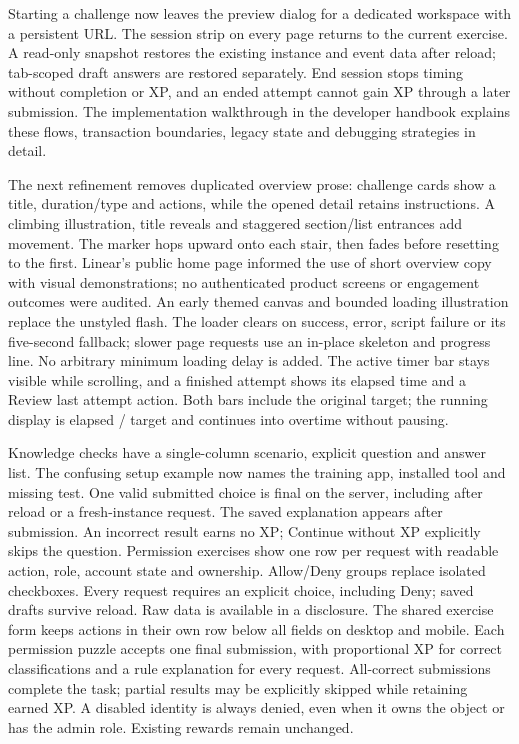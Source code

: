 Starting a challenge now leaves the preview dialog for a dedicated workspace with
a persistent URL. The session strip on every page returns to the current exercise.
A read-only snapshot restores the existing instance and event data after reload;
tab-scoped draft answers are restored separately. End session stops timing without
completion or XP, and an ended attempt cannot gain XP through a later submission.
The implementation walkthrough in the developer handbook explains these flows,
transaction boundaries, legacy state and debugging strategies in detail.

The next refinement removes duplicated overview prose: challenge cards show a title,
duration/type and actions, while the opened detail retains instructions. A climbing
illustration, title reveals and staggered section/list entrances add movement.
The marker hops upward onto each stair, then fades before resetting to the first.
Linear's public home page informed the use of short overview copy with visual
demonstrations; no authenticated product screens or engagement outcomes were audited.
An early themed canvas and bounded loading illustration replace the unstyled flash.
The loader clears on success, error, script failure or its five-second fallback;
slower page requests use an in-place skeleton and progress line. No arbitrary minimum
loading delay is added. The active timer bar stays visible while scrolling, and a
finished attempt shows its elapsed time and a Review last attempt action. Both bars
include the original target; the running display is elapsed / target and continues
into overtime without pausing.

Knowledge checks have a single-column scenario, explicit question and answer list.
The confusing setup example now names the training app, installed tool and missing
test. One valid submitted choice is final on the server, including after reload or
a fresh-instance request. The saved explanation appears after submission. An
incorrect result earns no XP; Continue without XP explicitly skips the question.
Permission exercises show one row per request with readable action, role, account
state and ownership. Allow/Deny groups replace isolated checkboxes. Every request
requires an explicit choice, including Deny; saved drafts survive reload. Raw data
is available in a disclosure. The shared exercise form keeps actions in their own
row below all fields on desktop and mobile.
Each permission puzzle accepts one final submission, with proportional XP for
correct classifications and a rule explanation for every request. All-correct
submissions complete the task; partial results may be explicitly skipped while
retaining earned XP. A disabled identity is always denied, even when it owns the
object or has the admin role. Existing rewards remain unchanged.

